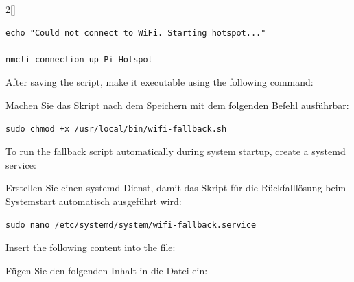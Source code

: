 \begin{paracol}{2}[]
\begin{lstlisting}[style=shell]
echo "Could not connect to WiFi. Starting hotspot..."

nmcli connection up Pi-Hotspot
\end{lstlisting}

\colstart

After saving the script, make it executable using the following command:

\colger

Machen Sie das Skript nach dem Speichern mit dem folgenden Befehl ausführbar:

\colende


\begin{lstlisting}[style=shell]
sudo chmod +x /usr/local/bin/wifi-fallback.sh
\end{lstlisting}

\colstart

To run the fallback script automatically during system startup, create a systemd service:

\colger

Erstellen Sie einen systemd-Dienst, damit das Skript für die Rückfalllösung beim Systemstart automatisch ausgeführt wird:

\colende


\begin{lstlisting}[style=shell]
sudo nano /etc/systemd/system/wifi-fallback.service
\end{lstlisting}

\colstart

Insert the following content into the file:

\colger

Fügen Sie den folgenden Inhalt in die Datei ein:


\end{paracol}
